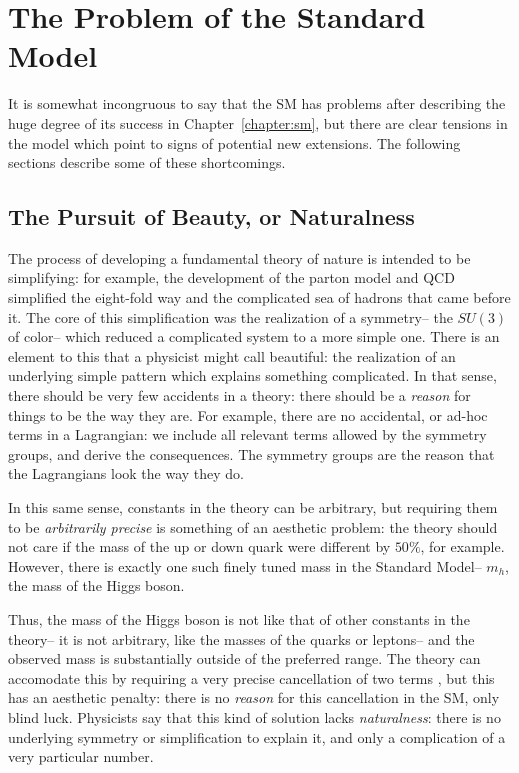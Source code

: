 \label{chapter:susy}

\section{The Problem of the Standard Model}
\label{chapter:susy:problems}

It is somewhat incongruous to say that the SM has problems after describing the huge degree of its success in Chapter~\ref{chapter:sm}, but there are clear tensions in the model which point to signs of potential new extensions. The following sections describe some of these shortcomings.

\subsection{The Pursuit of Beauty, or Naturalness}

The process of developing a fundamental theory of nature is intended to be simplifying: for example, the development of the parton model and QCD simplified the eight-fold way and the complicated sea of hadrons  that came before it. The core of this simplification was the realization of a symmetry-- the $SU(3)$ of color-- which reduced a complicated system to a more simple one. There is an element to this that a physicist might call beautiful: the realization of an underlying simple pattern which explains something complicated. In that sense, there should be very few accidents in a theory: there should be a \textit{reason} for things to be the way they are. For example, there are no accidental, or ad-hoc terms in a Lagrangian: we include all relevant terms allowed by the symmetry groups, and derive the consequences. The symmetry groups are the reason that the Lagrangians look the way they do.

In this same sense, constants in the theory can be arbitrary, but requiring them to be \textit{arbitrarily precise} is something of an aesthetic problem: the theory should not care if the mass of the up or down quark were different by $50\%$, for example. However, there is exactly one such finely tuned mass in the Standard Model-- $m_h$, the mass of the Higgs boson. 


Thus, the mass of the Higgs boson is not like that of other constants in the theory-- it is not arbitrary, like the masses of the quarks or leptons-- and the observed mass is substantially outside of the preferred range.  The theory can accomodate this by requiring a very precise cancellation of two terms , but this has an aesthetic penalty: there is no \textit{reason} for this cancellation in the SM, only blind luck. Physicists say that this kind of solution lacks \textit{naturalness}: there is no underlying symmetry or simplification to explain it, and only a complication of a very particular number.



